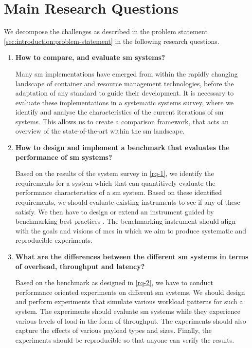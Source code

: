 \section{Main Research Questions}
\label{sec:introduction:research-questions}

We decompose the challenges as described in the problem statement \cref{sec:introduction:problem-statement} in the following research questions.


\begin{enumerate}[label=\textbf{RQ\arabic*}, leftmargin=3\parindent]
    \item \textbf{How to compare, and evaluate \gls{sm} systems?}
    \label{rq-1}
    
    Many \gls{sm} implementations have emerged from within the rapidly changing landscape of container and resource management technologies, before the adaptation of any standard to guide their development. It is necessary to evaluate these implementations in a systematic systems survey, where we identify and analyse the characteristics of the current iterations of \gls{sm} systems. This allows us to create a comparison framework, that acts an overview of the state-of-the-art within the \gls{sm} landscape.
    
    \item \textbf{How to design and implement a benchmark that evaluates the performance of \gls{sm} systems?}
    \label{rq-2}
    
    Based on the results of the system survey in \ref{rq-1}, we identify the requirements for a system which that can quantitively evaluate the performance characteristics of a \gls{sm} system. Based on these identified requirements, we should evaluate existing instruments to see if any of these satisfy. We then have to design or extend an instrument guided by benchmarking best practices \cite{folkerts2012benchmarking}. The benchmarking instrument should align with the goals and visions of \gls{mcs} in which we aim to produce systematic and reproducible experiments.
    
    \item \textbf{What are the differences between the different \gls{sm} systems in terms of overhead, throughput and latency?}
    \label{rq-3}
    
    Based on the benchmark as designed in \ref{rq-2}, we have to conduct performance oriented experiments on different \gls{sm} systems. We should design and perform experiments that simulate various workload patterns for such a system. The experiments should evaluate \gls{sm} systems while they experience various levels of load in the form of throughput. The experiments should also capture the effects of various payload types and sizes. Finally, the experiments should be reproducible so that anyone can verify the results.
\end{enumerate}

